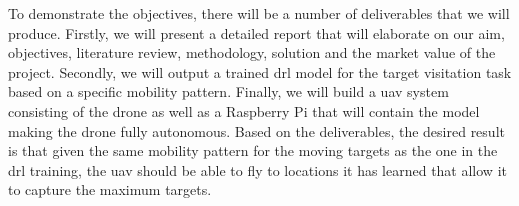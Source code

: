 \documentclass[../main.tex]{subfiles}
\begin{document}
To demonstrate the objectives, there will be a number 
of deliverables that we will produce.
Firstly, we will present a detailed report 
that will elaborate on our aim, objectives, 
literature review, methodology,
solution and the market value of the project.
Secondly, we will output a trained \gls{drl} model for 
the target visitation task based on a specific
mobility pattern.
Finally, we will build a \gls{uav} system
consisting of the \anafi drone as well as a Raspberry Pi
that will contain the model making the
\anafi drone fully autonomous.
Based on the deliverables, the desired result is that
given the same mobility pattern for 
the moving targets as the one in the \gls{drl} training,
the \gls{uav} should be able to fly to locations it has learned
that allow it to capture the maximum targets. 
\end{document}
